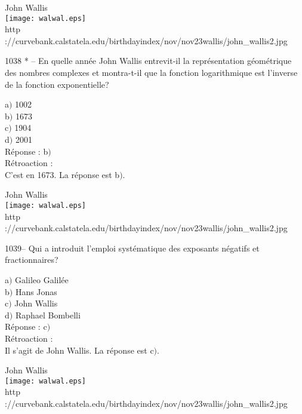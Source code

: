 ﻿\documentclass[letterpaper, 12pt]{article}
\begin{document}
        \begin{center}
        John Wallis\\
    \texttt{[image: walwal.eps]}\\
        {\footnotesize http
://curvebank.calstatela.edu/birthdayindex/nov/nov23wallis/john\_wallis2.jpg}
    \end{center}

1038 * -- En quelle ann\'ee John Wallis entrevit-il la
repr\'esentation g\'eom\'etrique des nombres complexes et
montra-t-il que la fonction logarithmique est l'inverse de la
fonction exponentielle?

a$)$ 1002 \\
b$)$ 1673  \\
c$)$ 1904  \\
d$)$ 2001 \\

R\'eponse : b$)$\\

R\'etroaction :\\
C'est en 1673.
La r\'eponse est b$)$.\\

        \begin{center}
        John Wallis\\
    \texttt{[image: walwal.eps]}\\
        {\footnotesize http
://curvebank.calstatela.edu/birthdayindex/nov/nov23wallis/john\_wallis2.jpg}
    \end{center}

1039-- Qui a introduit l'emploi syst\'ematique des exposants
n\'egatifs et fractionnaires?

a$)$ Galileo Galil\'ee \\
b$)$ Hans Jonas  \\
c$)$ John Wallis  \\
d$)$ Raphael Bombelli \\

R\'eponse : c$)$\\

R\'etroaction :\\
Il s'agit de John Wallis.
La r\'eponse est c$)$.\\

        \begin{center}
        John Wallis\\
    \texttt{[image: walwal.eps]}\\
        {\footnotesize http
://curvebank.calstatela.edu/birthdayindex/nov/nov23wallis/john\_wallis2.jpg}
    \end{center}
\end{document}

